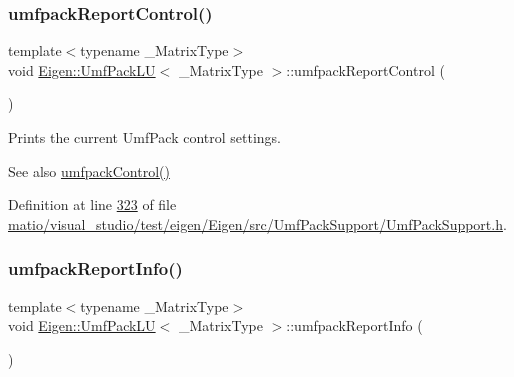 \mbox{\label{class_eigen_1_1_umf_pack_l_u_ac6ff58ef8eb8221e6af87de750d6619b}} 
\subsubsection{\texorpdfstring{umfpack\+Report\+Control()}{umfpackReportControl()}\hspace{0.1cm}{\footnotesize\ttfamily [2/2]}}
{\footnotesize\ttfamily template$<$typename \+\_\+\+Matrix\+Type$>$ \\
void \hyperlink{class_eigen_1_1_umf_pack_l_u}{Eigen\+::\+Umf\+Pack\+LU}$<$ \+\_\+\+Matrix\+Type $>$\+::umfpack\+Report\+Control (\begin{DoxyParamCaption}{ }\end{DoxyParamCaption})\hspace{0.3cm}{\ttfamily [inline]}}

Prints the current Umf\+Pack control settings.

\begin{DoxySeeAlso}{See also}
\hyperlink{class_eigen_1_1_umf_pack_l_u_a679bd267a0407d4ca985d97f0b864101}{umfpack\+Control()} 
\end{DoxySeeAlso}


Definition at line \hyperlink{matio_2visual__studio_2test_2eigen_2_eigen_2src_2_umf_pack_support_2_umf_pack_support_8h_source_l00323}{323} of file \hyperlink{matio_2visual__studio_2test_2eigen_2_eigen_2src_2_umf_pack_support_2_umf_pack_support_8h_source}{matio/visual\+\_\+studio/test/eigen/\+Eigen/src/\+Umf\+Pack\+Support/\+Umf\+Pack\+Support.\+h}.

\mbox{\label{class_eigen_1_1_umf_pack_l_u_afad062dfc49ca6d2d19d534b3f8f8d28}} 
\subsubsection{\texorpdfstring{umfpack\+Report\+Info()}{umfpackReportInfo()}\hspace{0.1cm}{\footnotesize\ttfamily [1/2]}}
{\footnotesize\ttfamily template$<$typename \+\_\+\+Matrix\+Type$>$ \\
void \hyperlink{class_eigen_1_1_umf_pack_l_u}{Eigen\+::\+Umf\+Pack\+LU}$<$ \+\_\+\+Matrix\+Type $>$\+::umfpack\+Report\+Info (\begin{DoxyParamCaption}{ }\end{DoxyParamCaption})\hspace{0.3cm}{\ttfamily [inline]}}

